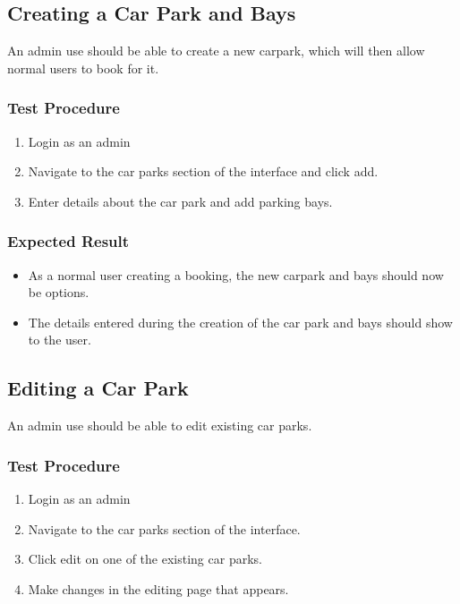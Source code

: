 \documentclass[a4paper, draft]{article}
\begin{document}
\newpage
\subsection{Creating a Car Park and Bays}
An admin use should be able to create a new carpark, which will then allow normal users to book for it.

\subsubsection{Test Procedure}
\begin{enumerate}
    \item Login as an admin
    \item Navigate to the car parks section of the interface and click add.
    \item Enter details about the car park and add parking bays.
\end{enumerate}

\subsubsection{Expected Result}
\begin{itemize}
    \item As a normal user creating a booking, the new carpark and bays should now be options.
    \item The details entered during the creation of the car park and bays should show to the user.
\end{itemize}

\subsection{Editing a Car Park}
An admin use should be able to edit existing car parks.

\subsubsection{Test Procedure}
\begin{enumerate}
    \item Login as an admin
    \item Navigate to the car parks section of the interface.
    \item Click edit on one of the existing car parks.
    \item Make changes in the editing page that appears.
\end{enumerate}
\end{document}
